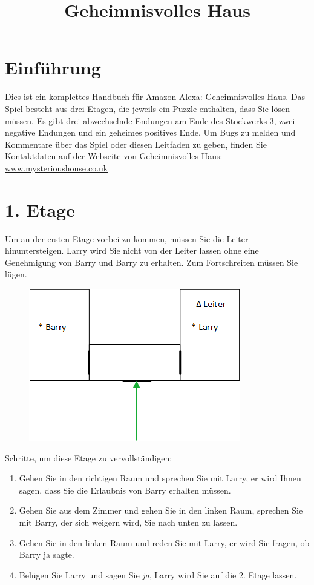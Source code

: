 \documentclass{article}
\begin{document}
\title{Geheimnisvolles Haus}
\date{}
\maketitle

\section*{Einf\"{u}hrung}
Dies ist ein komplettes Handbuch f\"{u}r Amazon Alexa: Geheimnisvolles Haus. Das Spiel besteht aus drei Etagen, die jeweils ein Puzzle enthalten, dass Sie l\"{o}sen m\"{u}ssen. Es gibt drei abwechselnde Endungen am Ende des Stockwerks 3, zwei negative Endungen und ein geheimes positives Ende. Um Bugs zu melden und Kommentare \"{u}ber das Spiel oder diesen Leitfaden zu geben, finden Sie Kontaktdaten auf der Webseite von Geheimnisvolles Haus: \url{www.mysterioushouse.co.uk}

\section*{1. Etage}
Um an der ersten Etage vorbei zu kommen, m\"{u}ssen Sie die Leiter hinuntersteigen. Larry wird Sie nicht von der Leiter lassen ohne eine Genehmigung von Barry und Barry zu erhalten. Zum Fortschreiten m\"{u}ssen Sie l\"{u}gen.

\begin{figure}[htb]
	\centering
	\includegraphics{Floor1.png}
\end{figure}

Schritte, um diese Etage zu vervollst\"{a}ndigen:

\begin{enumerate}
	\item Gehen Sie in den richtigen Raum und sprechen Sie mit Larry, er wird Ihnen sagen, dass Sie die Erlaubnis von Barry erhalten m\"{u}ssen.
	\item Gehen Sie aus dem Zimmer und gehen Sie in den linken Raum, sprechen Sie mit Barry, der sich weigern wird, Sie nach unten zu lassen.
	\item Gehen Sie in den linken Raum und reden Sie mit Larry, er wird Sie fragen, ob Barry ja sagte.
	\item Bel\"{u}gen Sie Larry und sagen Sie \textit{ja}, Larry wird Sie auf die 2. Etage lassen.
\end{enumerate}
\end{document}
